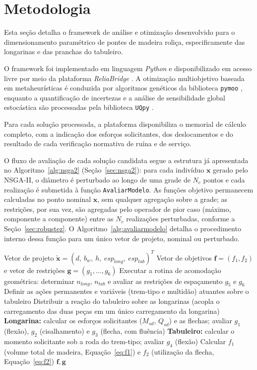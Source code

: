 \section{Metodologia}\label{sec:metodologia}

Esta seção detalha o framework de análise e otimização desenvolvido para o dimensionamento paramétrico de pontes de madeira roliça, especificamente das longarinas e das pranchas do tabuleiro.

O framework foi implementado em linguagem \textit{Python} e disponibilizado em acesso livre por meio da plataforma \textit{ReliaBridge} \parencite{ReliaBridge2026}.
A otimização multiobjetivo baseada em metaheurísticas é conduzida por algoritmos genéticos da biblioteca \texttt{pymoo} \parencite{blank2020}, enquanto a quantificação de incertezas e a análise de sensibilidade global estocástica são processadas pela biblioteca \texttt{UQpy} \parencite{Olivier2020}.

Para cada solução processada, a plataforma disponibiliza o memorial de cálculo completo, com a indicação dos esforços solicitantes, dos deslocamentos e do resultado de cada verificação normativa de ruína e de serviço.

O fluxo de avaliação de cada solução candidata segue a estrutura já apresentada no Algoritmo~\ref{alg:nsga2} (Seção~\ref{sec:nsga2}): para cada indivíduo $\mathbf{x}$ gerado pelo NSGA-II, o diâmetro é perturbado ao longo de uma grade de $N_c$ pontos e cada realização é submetida à função \texttt{AvaliarModelo}. As funções objetivo permanecem calculadas no ponto nominal $\mathbf{x}$, sem qualquer agregação sobre a grade; as restrições, por sua vez, são agregadas pelo operador de pior caso (máximo, componente a componente) entre as $N_c$ realizações perturbadas, conforme a Seção~\ref{sec:robustez}.
O Algoritmo~\ref{alg:avaliarmodelo} detalha o procedimento interno dessa função para um único vetor de projeto, nominal ou perturbado.

\begin{algorithm}[!ht]
\caption{AvaliarModelo($\tilde{\mathbf{x}}$)}
\label{alg:avaliarmodelo}
\begin{algorithmic}[1]
\Require Vetor de projeto $\tilde{\mathbf{x}} = (d,\ b_w,\ h,\ esp_{long},\ esp_{tab})^T$
\Ensure Vetor de objetivos $\mathbf{f} = (f_1, f_2)$ e vetor de restrições $\mathbf{g} = (g_1,\ldots,g_6)$
\State Executar a rotina de acomodação geométrica: determinar $n_{long}$, $n_{tab}$ e avaliar as restrições de espaçamento $g_5$ e $g_6$
\State Definir as ações permanentes e variáveis (trem-tipo e multidão) atuantes sobre o tabuleiro
\State Distribuir a reação do tabuleiro sobre as longarinas (acopla o carregamento das duas peças em um único carregamento da longarina)
\State \textbf{Longarina:} calcular os esforços solicitantes ($M_{sd}$, $Q_{sd}$) e as flechas; avaliar $g_1$ (flexão), $g_2$ (cisalhamento) e $g_3$ (flecha, com fluência)
\State \textbf{Tabuleiro:} calcular o momento solicitante sob a roda do trem-tipo; avaliar $g_4$ (flexão)
\State Calcular $f_1$ (volume total de madeira, Equação~\eqref{eq:f1}) e $f_2$ (utilização da flecha, Equação~\eqref{eq:f2})
\State \Return $\mathbf{f}, \mathbf{g}$
\end{algorithmic}
\end{algorithm}

